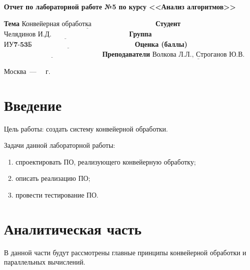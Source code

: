 \documentclass[12pt]{report}
\begin{document}
\begin{titlepage}
	\begin{center}
		\Large\textbf{Отчет по лабораторной работе №5 по курсу <<Анализ алгоритмов>>}
	\end{center}
	\newline\newline 
	\newline
	
	\noindent\textbf{Тема} $\underline{\textbf{Конвейерная обработка~~~~~~~~~~~~~~~~~~~~~~~~~~~}}$\newline\newline
	\noindent\textbf{Студент} $\underline{\textbf{Челядинов И.Д.~~~~~~~~~~~~~~~~~~~~~~~~~~~~~~~~~}}$\newline\newline
	\noindent\textbf{Группа} $\underline{\textbf{ИУ7-53Б~~~~~~~~~~~~~~~~~~~~~~~~~~~~~~~~~~~~~~~~~~~~}}$\newline\newline
	\noindent\textbf{Оценка (баллы)} $\underline{\textbf{~~~~~~~~~~~~~~~~~~~~~~~~~~~~~~~~~~~~~~~~~~}}$\newline\newline
	\noindent\textbf{Преподаватели} $\underline{\textbf{Волкова Л.Л., Строганов Ю.В.}}$\newline
	
	\begin{center}
		\vfill
		Москва~---~\the\year
		~г.
	\end{center}
 \restoregeometry
\end{titlepage}

\tableofcontents

\newpage
\chapter*{Введение}
Цель работы: создать систему конвейерной обработки.

Задачи данной лабораторной работы:
\begin{enumerate}
        \item спроектировать ПО, реализующего конвейерную обработку;
        \item описать реализацию ПО;
        \item провести тестирование ПО.
\end{enumerate}



\chapter{Аналитическая часть}
В данной части будут рассмотрены главные принципы конвейерной обработки и параллельных вычислений.
\end{document}
